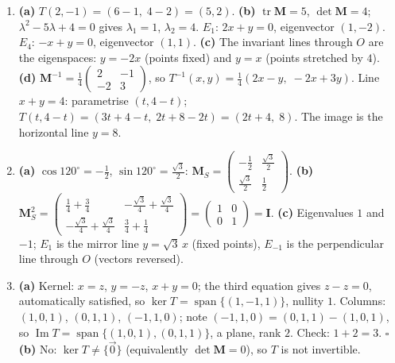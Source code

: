 \documentclass[11pt]{article}
\begin{document}
\begin{corrige}[Assessment]
\begin{enumerate}
    \item \textbf{(a)} $T(2,-1) = (6-1,\; 4-2) = (5,2)$.
        \textbf{(b)} $\operatorname{tr}\mathbf{M} = 5$, $\det\mathbf{M} = 4$; $\lambda^2 - 5\lambda + 4 = 0$ gives $\lambda_1 = 1$, $\lambda_2 = 4$.
        $E_1$: $2x + y = 0$, eigenvector $(1,-2)$. $E_4$: $-x + y = 0$, eigenvector $(1,1)$.
        \textbf{(c)} The invariant lines through $O$ are the eigenspaces: $y = -2x$ (points fixed) and $y = x$ (points stretched by $4$).
        \textbf{(d)} $\mathbf{M}^{-1} = \tfrac14\begin{pmatrix}2&-1\\-2&3\end{pmatrix}$, so $T^{-1}(x,y) = \tfrac14(2x-y,\; -2x+3y)$.
        Line $x+y=4$: parametrise $(t, 4-t)$; $T(t,4-t) = (3t + 4 - t,\; 2t + 8 - 2t) = (2t+4,\; 8)$. The image is the horizontal line $y = 8$.
    \item \textbf{(a)} $\cos120^\circ = -\tfrac12$, $\sin120^\circ = \tfrac{\sqrt3}{2}$: $\mathbf{M}_S = \begin{pmatrix} -\frac12 & \frac{\sqrt3}{2} \\[2pt] \frac{\sqrt3}{2} & \frac12 \end{pmatrix}$.
        \textbf{(b)} $\mathbf{M}_S^2 = \begin{pmatrix} \frac14+\frac34 & -\frac{\sqrt3}{4}+\frac{\sqrt3}{4} \\[2pt] -\frac{\sqrt3}{4}+\frac{\sqrt3}{4} & \frac34+\frac14 \end{pmatrix} = \begin{pmatrix}1&0\\0&1\end{pmatrix} = \mathbf{I}$.
        \textbf{(c)} Eigenvalues $1$ and $-1$; $E_1$ is the mirror line $y = \sqrt3\,x$ (fixed points), $E_{-1}$ is the perpendicular line through $O$ (vectors reversed).
    \item \textbf{(a)} Kernel: $x = z$, $y = -z$, $x + y = 0$; the third equation gives $z - z = 0$, automatically satisfied, so $\ker T = \operatorname{span}\{(1,-1,1)\}$, nullity $1$.
        Columns: $(1,0,1)$, $(0,1,1)$, $(-1,1,0)$; note $(-1,1,0) = (0,1,1) - (1,0,1)$, so $\operatorname{Im} T = \operatorname{span}\{(1,0,1), (0,1,1)\}$, a plane, rank $2$. Check: $1 + 2 = 3$. \hfill$\square$
        \textbf{(b)} No: $\ker T \neq \{\vec{0}\}$ (equivalently $\det\mathbf{M} = 0$), so $T$ is not invertible.
\end{enumerate}
\end{corrige}
\end{document}
